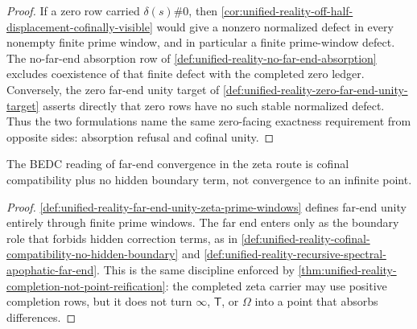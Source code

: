 \begin{proof}
If a zero row carried $\delta(s)\#0$, then
\autoref{cor:unified-reality-off-half-displacement-cofinally-visible}
would give a nonzero normalized defect in every nonempty finite prime
window, and in particular a finite prime-window defect.  The no-far-end
absorption row of
\autoref{def:unified-reality-no-far-end-absorption} excludes coexistence
of that finite defect with the completed zero ledger.  Conversely, the
zero far-end unity target of
\autoref{def:unified-reality-zero-far-end-unity-target} asserts directly
that zero rows have no such stable normalized defect.  Thus the two
formulations name the same zero-facing exactness requirement from
opposite sides: absorption refusal and cofinal unity.
\end{proof}

\begin{corollary}
\label{cor:unified-reality-far-end-unity-not-point-convergence}
The BEDC reading of far-end convergence in the zeta route is cofinal
compatibility plus no hidden boundary term, not convergence to an
infinite point.
\end{corollary}

\begin{proof}
\autoref{def:unified-reality-far-end-unity-zeta-prime-windows} defines
far-end unity entirely through finite prime windows.  The far end enters
only as the boundary role that forbids hidden correction terms, as in
\autoref{def:unified-reality-cofinal-compatibility-no-hidden-boundary}
and
\autoref{def:unified-reality-recursive-spectral-apophatic-far-end}.  This
is the same discipline enforced by
\autoref{thm:unified-reality-completion-not-point-reification}: the
completed zeta carrier may use positive completion rows, but it does not
turn $\infty$, $\mathsf{T}$, or $\Omega$ into a point that absorbs
differences.
\end{proof}
